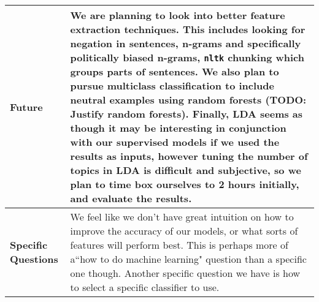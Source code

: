 \documentclass[11pt]{article}
\begin{document}
\begin{center}
\begin{tabular}{ | l | p{125mm} |  }
    \textbf{Future} & We are planning to look into better feature extraction techniques. This includes looking for negation in sentences, n-grams and specifically politically biased n-grams, \texttt{nltk} chunking which groups parts of sentences. We also plan to pursue multiclass classification to include neutral examples using random forests (TODO: Justify random forests). Finally, LDA seems as though it may be interesting in conjunction with our supervised models if we used the results as inputs, however tuning the number of topics in LDA is difficult and subjective, so we plan to time box ourselves to 2 hours initially, and evaluate the results. \\ \hline
    \textbf{Specific Questions} & We feel like we don't have great intuition on how to improve the accuracy of our models, or what sorts of features will perform best. This is perhaps more of a``how to do machine learning" question than a specific one though. Another specific question we have is how to select a specific classifier to use. \\ \hline
  \end{tabular}
\end{center}
\end{document}

